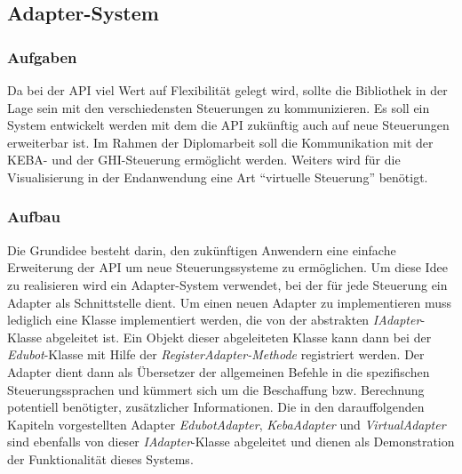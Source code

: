
\subsection{Adapter-System}

\subsubsection{Aufgaben}
Da bei der API viel Wert auf Flexibilität gelegt wird, sollte die Bibliothek in der Lage sein mit den verschiedensten Steuerungen zu kommunizieren. Es soll ein System entwickelt werden mit dem die API zukünftig auch auf neue Steuerungen erweiterbar ist. Im Rahmen der Diplomarbeit soll die Kommunikation mit der KEBA- und der GHI-Steuerung ermöglicht werden. Weiters wird für die Visualisierung in der Endanwendung eine Art “virtuelle Steuerung” benötigt.

\subsubsection{Aufbau}
Die Grundidee besteht darin, den zukünftigen Anwendern eine einfache Erweiterung der API um neue Steuerungssysteme zu ermöglichen. Um diese Idee zu realisieren wird ein Adapter-System verwendet, bei der für jede Steuerung ein Adapter als Schnittstelle dient. Um einen neuen Adapter zu implementieren muss lediglich eine Klasse implementiert werden, die von der abstrakten \textit{IAdapter}-Klasse abgeleitet ist. Ein Objekt dieser abgeleiteten Klasse kann dann bei der \textit{Edubot}-Klasse mit Hilfe der \textit{RegisterAdapter-Methode} registriert werden. Der Adapter dient dann als Übersetzer der allgemeinen Befehle in die spezifischen Steuerungssprachen und kümmert sich um die Beschaffung bzw. Berechnung potentiell benötigter, zusätzlicher Informationen. Die in den darauffolgenden Kapiteln vorgestellten Adapter  \textit{EdubotAdapter}, \textit{KebaAdapter} und \textit{VirtualAdapter} sind ebenfalls von dieser \textit{IAdapter}-Klasse abgeleitet und dienen als Demonstration der Funktionalität dieses Systems. 

